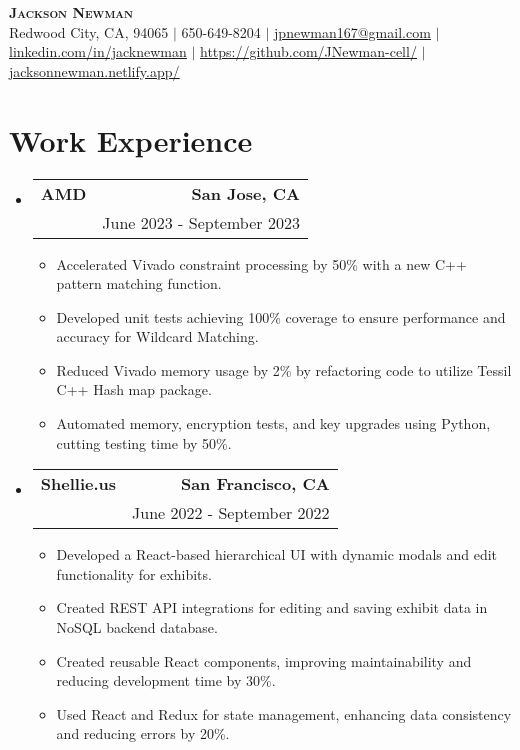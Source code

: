 \documentclass[letterpaper,11pt]{article}
\makeatletter
\newcommand{\resumeItem}[1]{
  \item\small{
    {#1 \vspace{-2pt}}
  }
}
\newcommand{\resumeSubheading}[4]{
  \vspace{-2pt}\item
    \begin{tabular*}{0.97\textwidth}[t]{l@{\extracolsep{\fill}}r}
      \textbf{#1} & #2 \\
      \text{#3} & #4 \\
    \end{tabular*}\vspace{-7pt}
}
\newcommand{\resumeSubHeadingListStart}{\begin{itemize}[leftmargin=0.15in, label={}]}
\newcommand{\resumeSubHeadingListEnd}{\end{itemize}}
\newcommand{\resumeItemListStart}{\begin{itemize}}
\newcommand{\resumeItemListEnd}{\end{itemize}\vspace{-5pt}}
\makeatother
\begin{document}

\begin{center}
    \textbf{\Huge \scshape Jackson Newman} \\ \vspace{1pt}
    \small Redwood City, CA, 94065 $|$ 650-649-8204 $|$ \href{mailto:jpnewman167@gmail.com}{\underline{jpnewman167@gmail.com}} $|$ 
    \href{https://www.linkedin.com/in/jacknewman/}{\underline{linkedin.com/in/jacknewman}} $|$
    \href{https://github.com/JNewman-cell/}{\underline{https://github.com/JNewman-cell/}} $|$
    \href{https://jacksonnewman.netlify.app/}{\underline{jacksonnewman.netlify.app/}}
\end{center}


\section{\textbf{Work Experience}}
  \resumeSubHeadingListStart
    \resumeSubheading
    {AMD}{\textbf{San Jose, CA}}
    {Software Engineer Intern, Internal Development Tooling}{June 2023 - September 2023}
    \resumeItemListStart
        \resumeItem{Accelerated Vivado constraint processing by 50\% with a new C++ pattern matching function.}
        \resumeItem{Developed unit tests achieving 100\% coverage to ensure performance and accuracy for Wildcard Matching.}
        \resumeItem{Reduced Vivado memory usage by 2\% by refactoring code to utilize Tessil C++ Hash map package.}
        \resumeItem{Automated memory, encryption tests, and key upgrades using Python, cutting testing time by 50\%.}
    \resumeItemListEnd

    \resumeSubheading
    {Shellie.us}{\textbf{San Francisco, CA}}
    {Full Stack Software Engineer Intern, MERN Stack}{June 2022 - September 2022}
    \resumeItemListStart
        \resumeItem{Developed a React-based hierarchical UI with dynamic modals and edit functionality for exhibits.}
        \resumeItem{Created REST API integrations for editing and saving exhibit data in NoSQL backend database.}
        \resumeItem{Created reusable React components, improving maintainability and reducing development time by 30\%.}
        \resumeItem{Used React and Redux for state management, enhancing data consistency and reducing errors by 20\%.}
    \resumeItemListEnd
  \resumeSubHeadingListEnd
\end{document}
